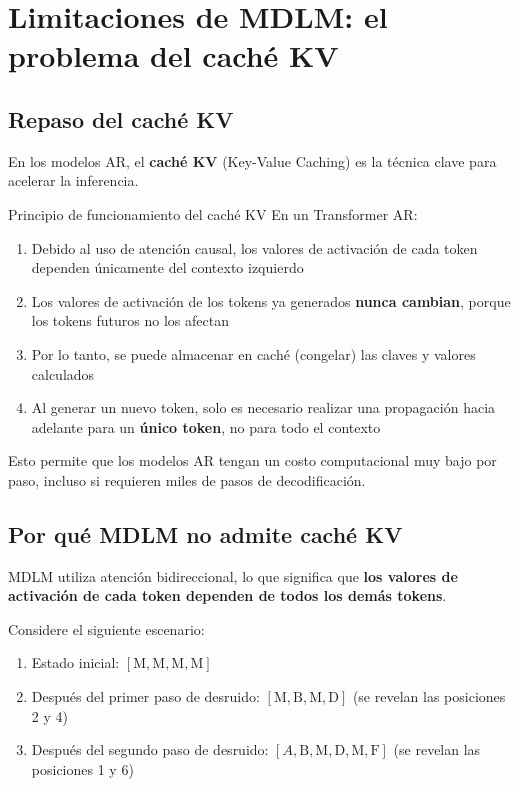 \section{Limitaciones de MDLM: el problema del caché KV}

\subsection{Repaso del caché KV}

En los modelos AR, el \textbf{caché KV} (Key-Value Caching) es la técnica clave para acelerar la inferencia.

\begin{knowledgebox}{Principio de funcionamiento del caché KV}
En un Transformer AR:
\begin{enumerate}
    \item Debido al uso de atención causal, los valores de activación de cada token dependen únicamente del contexto izquierdo
    \item Los valores de activación de los tokens ya generados \textbf{nunca cambian}, porque los tokens futuros no los afectan
    \item Por lo tanto, se puede almacenar en caché (congelar) las claves y valores calculados
    \item Al generar un nuevo token, solo es necesario realizar una propagación hacia adelante para un \textbf{único token}, no para todo el contexto
\end{enumerate}
Esto permite que los modelos AR tengan un costo computacional muy bajo por paso, incluso si requieren miles de pasos de decodificación.
\end{knowledgebox}

\subsection{Por qué MDLM no admite caché KV}

MDLM utiliza atención bidireccional, lo que significa que \textbf{los valores de activación de cada token dependen de todos los demás tokens}.

Considere el siguiente escenario:
\begin{enumerate}
    \item Estado inicial: $[\text{M}, \text{M}, \text{M}, \text{M}]$
    \item Después del primer paso de desruido: $[\text{M}, \text{B}, \text{M}, \text{D}]$ (se revelan las posiciones 2 y 4)
    \item Después del segundo paso de desruido: $[A, \text{B}, \text{M}, \text{D}, \text{M}, \text{F}]$ (se revelan las posiciones 1 y 6)
\end{enumerate}

